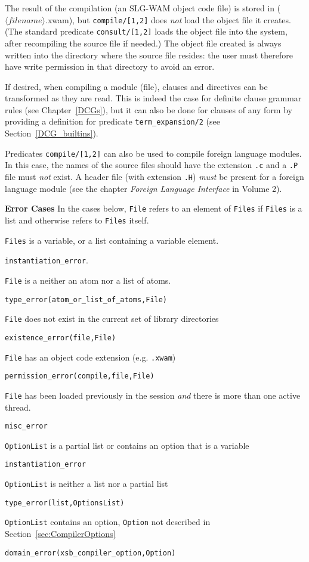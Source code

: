 \begin{description}
The result of the compilation (an SLG-WAM object code file) is stored
in ($\langle filename \rangle$.xwam), but {\tt compile/[1,2]} does {\em
  not\/} load the object file it creates.  (The standard predicate
{\tt consult/[1,2]} loads the object file into the system, after
recompiling the source file if needed.)  The object file created is
always written into the directory where the source file resides: the
user must therefore have write permission in that directory to avoid
an error.
 
If desired, when compiling a module (file), clauses and directives can be
transformed as they are read.  This is indeed the case for definite clause
grammar rules (see Chapter~\ref{DCGs}), but it can also be done for clauses
of any form by providing a definition for predicate {\tt term\_expansion/2}
(see Section~\ref{DCG_builtins}).

Predicates {\tt compile/[1,2]} can also be used to compile foreign
language modules.  In this case, the names of the source files should
have the extension {\tt .c} and a {\tt .P} file must {\em not\/}
exist.  A header file (with extension {\tt .H}) {\em must} be present
for a foreign language module (see the chapter {\it Foreign Language
Interface} in Volume 2).

{\bf Error Cases}
In the cases below, {\tt File} refers to an element of {\tt Files} if
{\tt Files} is a list and otherwise refers to {\tt Files} itself.
\bi
\item 	{\tt Files} is a variable, or a list containing a variable element.
\bi
\item 	{\tt instantiation\_error}.
\ei
\item  {\tt File} is a neither an atom nor a list of atoms.
\bi
\item 	{\tt type\_error(atom\_or\_list\_of\_atoms,File)}
\ei
\item  {\tt File} does not exist in the current set of
  library directories 
\bi
\item 	{\tt existence\_error(file,File)}
\ei
%
\item 	{\tt File} has an object code extension (e.g. {\tt .xwam})
\bi
\item 	{\tt permission\_error(compile,file,File)}
\ei
%
\item {\tt File} has been loaded previously in the session {\em and}
  there is more than one active thread.  
\bi
\item 	{\tt misc\_error}
\ei
\item 	{\tt OptionList} is a partial list or contains an option that is a variable
\bi
\item 	{\tt instantiation\_error}
\ei
\item 	{\tt OptionList} is neither a list nor a partial list
\bi
\item 	{\tt type\_error(list,OptionsList)}
\ei
\item {\tt OptionList} contains an option, {\tt Option} not described
  in Section~\ref{sec:CompilerOptions} 
\bi
\item 	{\tt domain\_error(xsb\_compiler\_option,Option)}
\ei
\ei

\end{description}

